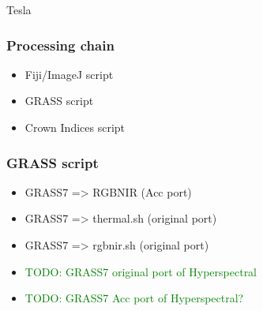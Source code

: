 \documentclass[serif,mathserif,aspectratio=169]{beamer}
\begin{document}
{
\begin{frame}[plain]
\begin{shaded}
\Huge Tesla
\end{shaded}
\end{frame}}


\begin{frame}
  \frametitle{Processing chain}
\begin{center}
\begin{itemize}
 \item Fiji/ImageJ script 
 \item GRASS script
 \item Crown Indices script
\end{itemize}
\end{center}
\end{frame}


\begin{frame}
  \frametitle{GRASS script}
\begin{center}
\begin{itemize}
 \item GRASS7 => RGBNIR (Acc port)
 \item GRASS7 => thermal.sh (original port)
 \item GRASS7 => rgbnir.sh (original port)
 \item \textcolor{green}{TODO: GRASS7 original port of Hyperspectral}
  \item \textcolor{green}{TODO: GRASS7 Acc port of Hyperspectral?}
\end{itemize}
\end{center}
\end{frame}
\end{document}
